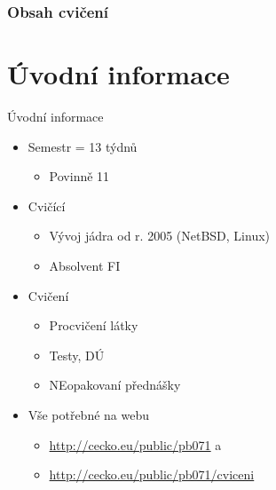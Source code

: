 


\subtitle{I. Lehký průlet jazykem}
\date{18. 2. \the\year}



\begin{frame}
  \titlepage
\end{frame}


\begin{frame}
  \frametitle{Obsah cvičení}
  \tableofcontents
\end{frame}

\section{Úvodní informace}
\frame{\sectionpage}

\begin{frame}{Úvodní informace}

  \begin{itemize}
    \item Semestr = 13 týdnů
    \begin{itemize}
      \item Povinně 11
    \end{itemize}

    \pause

    \item Cvičící
    \begin{itemize}
      \item Vývoj jádra od r. 2005 (NetBSD, Linux)
      \item Absolvent FI
    \end{itemize}

    \pause

    \item Cvičení
    \begin{itemize}
      \item Procvičení látky
      \item Testy, DÚ
      \item NEopakovaní přednášky
    \end{itemize}

    \pause

    \item Vše potřebné na webu
    \begin{itemize}
      \item \url{http://cecko.eu/public/pb071} a
      \item \url{http://cecko.eu/public/pb071/cviceni}
    \end{itemize}

  \end{itemize}

\end{frame}


